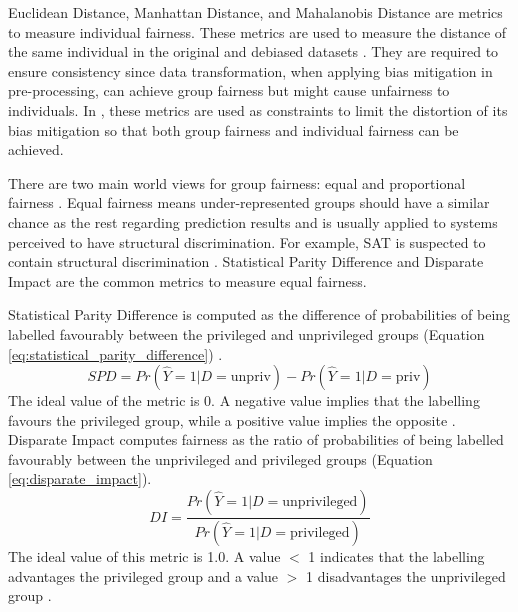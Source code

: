 \documentclass[sigconf,review]{acmart}
\begin{document}
	Euclidean Distance, Manhattan Distance, and Mahalanobis Distance are metrics to measure individual fairness. These metrics are used to measure the distance of the same individual in the original and debiased datasets \cite{bellamy2018ai}. They are required to ensure consistency since data transformation, when applying bias mitigation in pre-processing, can achieve group fairness but might cause unfairness to individuals. In \cite{calmon2017optimized},   these metrics are used as constraints to limit the distortion of its bias mitigation so that both group fairness and individual fairness can be achieved. 
	
	There are two main world views for group fairness: equal and proportional fairness \cite{mahoney2020ai,ibmaif3602022guidance}. Equal fairness means under-represented groups should have a similar chance as the rest regarding prediction results and is usually applied to systems perceived to have structural discrimination. For example, SAT is suspected to contain structural discrimination \cite{mahoney2020ai,ibmaif3602022guidance}. Statistical Parity Difference \cite{dwork2012fairness,mahoney2020ai,ibmaif3602022guidance} and Disparate Impact \cite{feldman2015disparate,mahoney2020ai,ibmaif3602022guidance} are the common metrics to measure equal fairness. 
	
	Statistical Parity Difference is computed as the difference of probabilities of being labelled favourably between the privileged and unprivileged groups (Equation \ref{eq:statistical_parity_difference}) \cite{dwork2012fairness,ibmaif3602022doc,bellamy2018ai}. 
	\begin{equation} \label{eq:statistical_parity_difference}
		SPD = Pr(\hat{Y} = 1 | D = \text{unpriv})
		- Pr(\hat{Y} = 1 | D = \text{priv})
	\end{equation}
	The ideal value of the metric is 0. A negative value implies that the labelling favours the privileged group, while a positive value implies the opposite \cite{ibmaif3602022doc,bellamy2018ai}. Disparate Impact \cite{feldman2015disparate,ibmaif3602022doc,bellamy2018ai} computes fairness as the ratio of probabilities of being labelled favourably between the unprivileged and privileged groups (Equation \ref{eq:disparate_impact}).
	\begin{equation} \label{eq:disparate_impact}
		DI = \frac{Pr(\hat{Y} = 1 | D = \text{unprivileged})}
		{Pr(\hat{Y} = 1 | D = \text{privileged})}
	\end{equation}
	The ideal value of this metric is 1.0. A value $<$ 1 indicates that the labelling advantages the privileged group and a value $>$ 1 disadvantages the unprivileged group \cite{ibmaif3602022doc,bellamy2018ai}.
	
\end{document}
